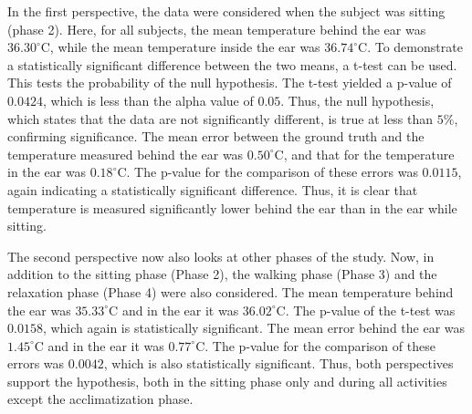 In the first perspective, the data were considered when the subject was sitting (phase 2). 
Here, for all subjects, the mean temperature behind the ear was \(36.30^\circ\text{C}\), while the mean temperature inside the ear was \(36.74^\circ\text{C}\). 
To demonstrate a statistically significant difference between the two means, a t-test can be used.
This tests the probability of the null hypothesis.
The t-test yielded a p-value of \(0.0424\), which is less than the alpha value of \(0.05\). 
Thus, the null hypothesis, which states that the data are not significantly different, is true at less than $5\%$, confirming significance.
The mean error between the ground truth and the temperature measured behind the ear was \(0.50^\circ\text{C}\), and that for the temperature in the ear was \(0.18^\circ\text{C}\). 
The p-value for the comparison of these errors was \(0.0115\), again indicating a statistically significant difference.
Thus, it is clear that temperature is measured significantly lower behind the ear than in the ear while sitting.

The second perspective now also looks at other phases of the study. 
Now, in addition to the sitting phase (Phase 2), the walking phase (Phase 3) and the relaxation phase (Phase 4) were also considered. 
The mean temperature behind the ear was \(35.33^\circ\text{C}\) and in the ear it was \(36.02^\circ\text{C}\). 
The p-value of the t-test was \(0.0158\), which again is statistically significant.
The mean error behind the ear was \(1.45^\circ\text{C}\) and in the ear it was \(0.77^\circ\text{C}\). 
The p-value for the comparison of these errors was \(0.0042\), which is also statistically significant.
Thus, both perspectives support the hypothesis, both in the sitting phase only and during all activities except the acclimatization phase.


